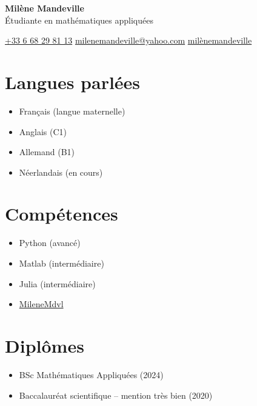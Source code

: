 \documentclass[10pt]{article}
\begin{document}
\pagestyle{empty}
\begin{center}
    {\textbf{\huge Milène Mandeville}}\\\Large{Étudiante en mathématiques appliquées}\vspace{3mm}
\end{center}
\begin{center}
     \href{https://wa.link/fxuzgz}{+33 6 68 29 81 13} \hspace{1cm}
     \href{mailto:milenemandeville@yahoo.com}{milenemandeville@yahoo.com} \hspace{1cm}
     \href{https://www.linkedin.com/in/milène-mandeville}{milènemandeville}\vspace{3mm}
\end{center}
\begin{minipage}[t]{0.3\linewidth}
\section*{Langues parlées}
\begin{itemize}
    \item Français (langue maternelle)
    \item Anglais (C1)
    \item Allemand (B1)
    \item Néerlandais (en cours)
\end{itemize}
\end{minipage}\hfill
\begin{minipage}[t]{0.3\linewidth}
\section*{Compétences}
\begin{itemize}
    \item Python (avancé)
    \item Matlab (intermédiaire)
    \item Julia (intermédiaire)
    \item[\faGithub] \href{https://github.com/MileneMdvl}{MileneMdvl}
\end{itemize}
\end{minipage}\hfill
\begin{minipage}[t]{0.3\linewidth}
\section*{Diplômes}
\begin{itemize}
    \item BSc Mathématiques Appliquées (2024)
    \item Baccalauréat scientifique -- mention très bien (2020)
\end{itemize}
\end{minipage}
\end{document}
